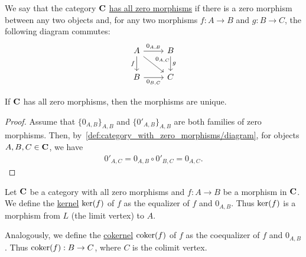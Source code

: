 \begin{definition}\label{def:category_with_zero_morphisms}
  We say that the category $\operatorname{\mathbf{C}}$ \uline{has all zero morphisms} if there is a zero morphism between any two objects and, for any two morphisms \mbox{$f: A \to B$} and \mbox{$g: B \to C$}, the following diagram commutes:
  \begin{equation}\label{def:category_with_zero_morphisms/diagram}
    \begin{tikzcd}[baseline=(current bounding box.center)]
      A \arrow[d, "f"'] \arrow[r, "0_{A,B}"] \arrow[rd, "0_{A,C}"] & B \arrow[d, "g"] \\
      B \arrow[r, "0_{B,C}"']                                      & C
    \end{tikzcd}
  \end{equation}
\end{definition}

\begin{proposition}\label{thm:zero_morphisms_are_unique}
  If $\operatorname{\mathbf{C}}$ has all zero morphisms, then the morphisms are unique.
\end{proposition}
\begin{proof}
  Assume that $\{ 0_{A,B} \}_{A,B}$ and $\{ 0'_{A,B} \}_{A,B}$ are both families of zero morphisms. Then, by~\cref{def:category_with_zero_morphisms/diagram}, for objects $A, B, C \in \operatorname{\mathbf{C}}$, we have
  \begin{align*}
    0'_{A,C} = 0_{A,B} \circ 0'_{B,C} = 0_{A,C}.
  \end{align*}
\end{proof}

\begin{definition}\label{def:categorical_kernel}
  Let $\operatorname{\mathbf{C}}$ be a category with all zero morphisms and $f: A \to B$ be a morphism in $\operatorname{\mathbf{C}}$. We define the \uline{kernel} $\operatorname{ker}(f)$ of $f$ as the equalizer of $f$ and $0_{A,B}$. Thus $\operatorname{ker}(f)$ is a morphism from $L$ (the limit vertex) to $A$.

  Analogously, we define the \uline{cokernel} $\operatorname{coker}(f)$ of $f$ as the coequalizer of $f$ and $0_{A,B}$. Thus $\operatorname{coker}(f): B \to C$, where $C$ is the colimit vertex.
\end{definition}
